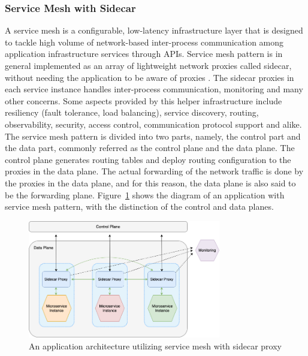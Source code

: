 \documentclass{Configuration_Files/PoliMi3i_thesis}
\begin{document}
\subsubsection{Service Mesh with Sidecar}
\label{subsubsec:service_mesh}

A service mesh is a configurable, low-latency infrastructure layer that is designed to tackle high volume of network-based inter-process communication among  application infrastructure services through APIs.
Service mesh pattern is in general implemented as an array of lightweight network proxies called sidecar, without needing the application to be aware of proxies \cite{li2019service}. The sidecar proxies in each service instance handles inter-process communication, monitoring and many other concerns.
Some aspects provided by this helper infrastructure include resiliency (fault tolerance, load balancing), service discovery, routing, observability, security, access control, communication protocol support and alike.
\\
The service mesh pattern is divided into two parts, namely, the control part and the data part, commonly referred as the control plane and the data plane. The control plane generates routing tables and deploy routing configuration to the proxies in the data plane. The actual forwarding of the network traffic is done by the proxies in the data plane, and for this reason, the data plane is also said to be the forwarding plane. Figure~\ref{fig:service_mesh} shows the diagram of an application with service mesh pattern, with the distinction of the control and data planes.

\begin{figure}[H]
    \centering
    \includegraphics[width=0.75\textwidth]{myImages/mesh.png}
    \caption{An application architecture utilizing service mesh with sidecar proxy}
    \label{fig:service_mesh}
\end{figure}
\end{document}
